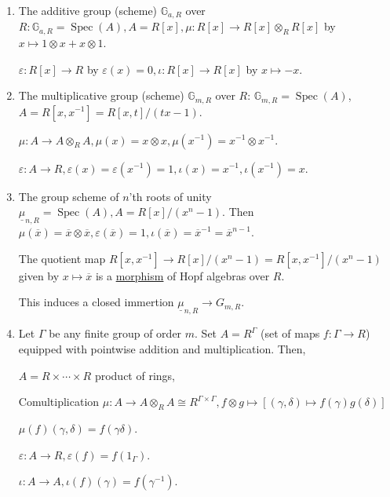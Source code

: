 \documentclass{article}
\theoremstyle{definition}
\numberwithin{theorem}{subsection}
\begin{document}
    \begin{enumerate}[label=\arabic*)]
        \item The additive group (scheme) \(\mathbb{G}_{a,R}\) over \(R: \mathbb{G}_{a,R} = \operatorname{Spec}(A), A = R[x], \mu: R[x] \to R[x] \otimes_R R[x]\) by \(x \mapsto 1 \otimes x + x \otimes 1\).
        
        \(\varepsilon : R[x] \to R\) by \(\varepsilon(x)=0, \iota : R[x] \to R[x]\) by \(x \mapsto -x\).

        \item The multiplicative group (scheme) \(\mathbb{G}_{m,R}\) over \(R\): \(\mathbb{G}_{m,R}=\operatorname{Spec}(A)\), \(A = R[x,x ^{-1} ] = R[x,t] / (tx-1)\).
        
        \(\mu: A \to A \otimes_R A, \mu(x) = x \otimes x, \mu(x ^{-1}) = x ^{-1} \otimes x ^{-1}\).

        \(\varepsilon: A \to R, \varepsilon(x) = \varepsilon(x ^{-1}) = 1, \iota (x) = x ^{-1} , \iota(x ^{-1}) = x\).

        \item The group scheme of \(n\)'th roots of unity \(\underline{\mu}_{n,R}=\operatorname{Spec}(A), A = R[x] / (x^n - 1)\). Then \(\mu(\overline{x}) = \overline{x} \otimes \overline{x}, \varepsilon(\overline{x}) = 1, \iota(\overline{x}) = \overline{x}^{-1} = \overline{x}^{n-1}\).
        
        The quotient map \(R[x, x ^{-1}] \to R[x] / (x^n - 1) = R[x, x ^{-1}] / (x^n - 1)\) given by \(x \mapsto \overline{x}\) is a \underline{morphism} of Hopf algebras over \(R\).
        
        This induces a closed immertion \(\underline{\mu}_{n,R} \to G_{m,R}\).

        \item Let \(\Gamma\) be any finite group of order \(m\). Set \(A = R^\Gamma\) (set of maps \(f: \Gamma \to R\)) equipped with pointwise addition and multiplication. Then,
        
        \(A = R \times \cdots \times R\) product of rings,

        Comultiplication \(\mu: A \to A \otimes_R A \cong R^{\Gamma \times \Gamma}, f \otimes g \mapsto [(\gamma,\delta) \mapsto f(\gamma)g(\delta)]\) 

        \(\mu(f)(\gamma,\delta) = f(\gamma \delta)\).
        
        \(\varepsilon: A \to R, \varepsilon(f) = f(1_\Gamma)\).
        
        \(\iota: A \to A, \iota(f)(\gamma) = f(\gamma ^{-1})\).
        

\end{enumerate}
\end{document}
